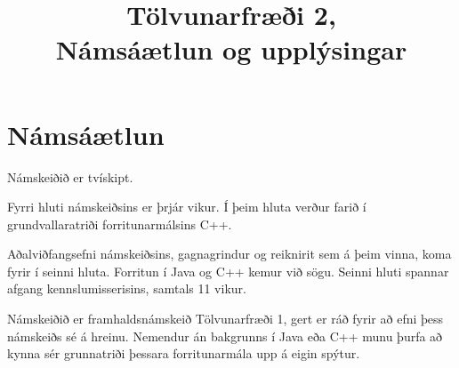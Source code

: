 \documentclass{article}
\title{Tölvunarfræði 2, \semester \\ Námsáætlun og upplýsingar}
\author{}
\begin{document}
\maketitle
{}

\section{Námsáætlun}
\label{sec:schedule}

Námskeiðið er tvískipt.

Fyrri hluti námskeiðsins er þrjár vikur. Í þeim hluta verður farið í grundvallaratriði forritunarmálsins C++.

Aðalviðfangsefni námskeiðsins, gagnagrindur og reiknirit sem á þeim vinna, koma fyrir í seinni hluta. Forritun í Java og C++ kemur við sögu. Seinni hluti spannar afgang kennslumisserisins, samtals 11 vikur.

Námskeiðið er framhaldsnámskeið Tölvunarfræði 1, gert er ráð fyrir að efni þess námskeiðs sé á hreinu. Nemendur án bakgrunns í Java eða C++ munu þurfa að kynna sér grunnatriði þessara forritunarmála upp á eigin spýtur.
\end{document}
